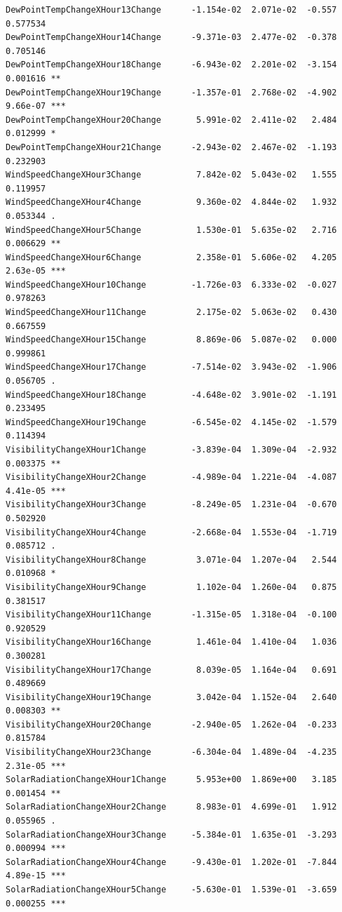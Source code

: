\documentclass[
  letterpaper,
  DIV=11,
  numbers=noendperiod]{scrartcl}
\begin{document}
\begin{verbatim}
DewPointTempChangeXHour13Change      -1.154e-02  2.071e-02  -0.557 0.577534    
DewPointTempChangeXHour14Change      -9.371e-03  2.477e-02  -0.378 0.705146    
DewPointTempChangeXHour18Change      -6.943e-02  2.201e-02  -3.154 0.001616 ** 
DewPointTempChangeXHour19Change      -1.357e-01  2.768e-02  -4.902 9.66e-07 ***
DewPointTempChangeXHour20Change       5.991e-02  2.411e-02   2.484 0.012999 *  
DewPointTempChangeXHour21Change      -2.943e-02  2.467e-02  -1.193 0.232903    
WindSpeedChangeXHour3Change           7.842e-02  5.043e-02   1.555 0.119957    
WindSpeedChangeXHour4Change           9.360e-02  4.844e-02   1.932 0.053344 .  
WindSpeedChangeXHour5Change           1.530e-01  5.635e-02   2.716 0.006629 ** 
WindSpeedChangeXHour6Change           2.358e-01  5.606e-02   4.205 2.63e-05 ***
WindSpeedChangeXHour10Change         -1.726e-03  6.333e-02  -0.027 0.978263    
WindSpeedChangeXHour11Change          2.175e-02  5.063e-02   0.430 0.667559    
WindSpeedChangeXHour15Change          8.869e-06  5.087e-02   0.000 0.999861    
WindSpeedChangeXHour17Change         -7.514e-02  3.943e-02  -1.906 0.056705 .  
WindSpeedChangeXHour18Change         -4.648e-02  3.901e-02  -1.191 0.233495    
WindSpeedChangeXHour19Change         -6.545e-02  4.145e-02  -1.579 0.114394    
VisibilityChangeXHour1Change         -3.839e-04  1.309e-04  -2.932 0.003375 ** 
VisibilityChangeXHour2Change         -4.989e-04  1.221e-04  -4.087 4.41e-05 ***
VisibilityChangeXHour3Change         -8.249e-05  1.231e-04  -0.670 0.502920    
VisibilityChangeXHour4Change         -2.668e-04  1.553e-04  -1.719 0.085712 .  
VisibilityChangeXHour8Change          3.071e-04  1.207e-04   2.544 0.010968 *  
VisibilityChangeXHour9Change          1.102e-04  1.260e-04   0.875 0.381517    
VisibilityChangeXHour11Change        -1.315e-05  1.318e-04  -0.100 0.920529    
VisibilityChangeXHour16Change         1.461e-04  1.410e-04   1.036 0.300281    
VisibilityChangeXHour17Change         8.039e-05  1.164e-04   0.691 0.489669    
VisibilityChangeXHour19Change         3.042e-04  1.152e-04   2.640 0.008303 ** 
VisibilityChangeXHour20Change        -2.940e-05  1.262e-04  -0.233 0.815784    
VisibilityChangeXHour23Change        -6.304e-04  1.489e-04  -4.235 2.31e-05 ***
SolarRadiationChangeXHour1Change      5.953e+00  1.869e+00   3.185 0.001454 ** 
SolarRadiationChangeXHour2Change      8.983e-01  4.699e-01   1.912 0.055965 .  
SolarRadiationChangeXHour3Change     -5.384e-01  1.635e-01  -3.293 0.000994 ***
SolarRadiationChangeXHour4Change     -9.430e-01  1.202e-01  -7.844 4.89e-15 ***
SolarRadiationChangeXHour5Change     -5.630e-01  1.539e-01  -3.659 0.000255 ***

\end{verbatim}
\end{document}

